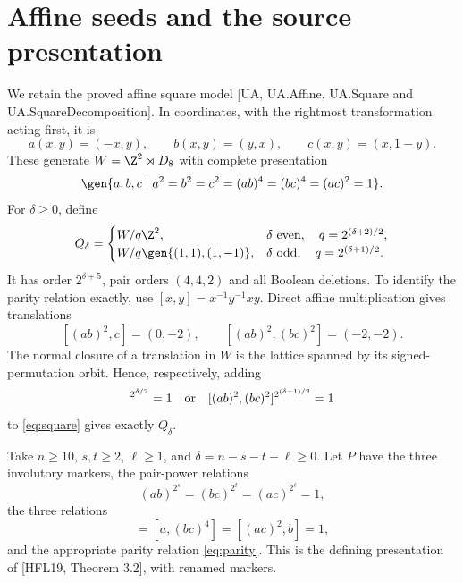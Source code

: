 \section{Affine seeds and the source presentation}
We retain the proved affine square model [UA, UA.Affine, UA.Square and
UA.SquareDecomposition]. In coordinates, with the rightmost transformation
acting first, it is
\[
 a(x,y)=(-x,y),\qquad b(x,y)=(y,x),\qquad c(x,y)=(x,1-y).
\]
These generate $W=\Z^2\rtimes D_8$ with complete presentation
\begin{equation}
 \gen{a,b,c\mid a^2=b^2=c^2=(ab)^4=(bc)^4=(ac)^2=1}.           \label{eq:square}
\end{equation}
For $\delta\geq0$, define
\[
 Q_\delta=\begin{cases}
 W/q\Z^2,&\delta\text{ even},\quad q=2^{(\delta+2)/2},\\
 W/q\gen{(1,1),(1,-1)},&\delta\text{ odd},\quad q=2^{(\delta+1)/2}.
 \end{cases}
\]
It has order $2^{\delta+5}$, pair orders $(4,4,2)$ and all Boolean deletions.
To identify the parity relation exactly, use $[x,y]=x^{-1}y^{-1}xy$.
Direct affine multiplication gives translations
\[
 [(ab)^2,c]=(0,-2),\qquad [(ab)^2,(bc)^2]=(-2,-2).
\]
The normal closure of a translation in $W$ is the lattice spanned by its
signed-permutation orbit. Hence, respectively, adding
\begin{equation}
 [(ab)^2,c]^{2^{\delta/2}}=1\quad\hbox{or}\quad
 [(ab)^2,(bc)^2]^{2^{(\delta-1)/2}}=1                          \label{eq:parity}
\end{equation}
to \eqref{eq:square} gives exactly $Q_\delta$.

Take $n\geq10$, $s,t\geq2$, $\ell\geq1$, and
$\delta=n-s-t-\ell\geq0$. Let $P$ have the three involutory markers,
the pair-power relations
\[
 (ab)^{2^s}=(bc)^{2^t}=(ac)^{2^\ell}=1,
\]
the three relations
\begin{equation}
 [(ab)^4,c]=[a,(bc)^4]=[(ac)^2,b]=1,                           \label{eq:normal}
\end{equation}
and the appropriate parity relation \eqref{eq:parity}. This is the defining
presentation of [HFL19, Theorem 3.2], with renamed markers.

